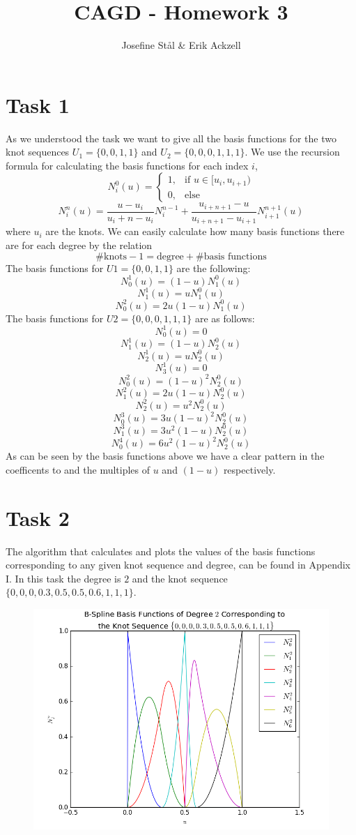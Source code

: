 \documentclass[]{article}
\title{CAGD - Homework 3}
\author{Josefine St{\aa}l \& Erik Ackzell}
\begin{document}
\maketitle

\section*{Task 1}
As we understood the task we want to give all the basis functions for the two knot sequences $U_1=\{0,0,1,1\}$ and $U_2=\{0,0,0,1,1,1\}$. We use the recursion formula for calculating the basis functions for each index $i$,
$$N_i^0(u)=\left\{ \begin{array}{ll}
1, & \text{if } u\in [u_i,u_{i+1}) \\
0, & \text{else} \end{array}\right.$$
$$N_i^n(u)=\frac{u-u_i}{u_i+n-u_i}N_i^{n-1}+\frac{u_{i+n+1}-u}{u_{i+n+1}-u_{i+1}}N_{i+1}^{n+1}(u)$$
where $u_i$ are the knots. We can easily calculate how many basis functions there are for each degree by the relation $$\#\text{knots}-1=\text{degree}+\#\text{basis functions}$$ 
The basis functions for $U1=\{0,0,1,1\}$ are the following:
$$N_0^1(u)=(1-u)N_1^0(u)$$
$$N_1^1(u)=uN_1^0(u)$$
$$N_0^2(u)=2u(1-u)N_1^0(u)$$
The basis functions for $U2=\{0,0,0,1,1,1\}$ are as follows:
$$N_0^1(u)=0$$
$$N_1^1(u)=(1-u)N_2^0(u)$$
$$N_2^1(u)=uN_2^0(u)$$
$$N_3^1(u)=0$$
$$N_0^2(u)=(1-u)^2N_2^0(u)$$
$$N_1^2(u)=2u(1-u)N_2^0(u)$$
$$N_2^2(u)=u^2N_2^0(u)$$
$$N_0^3(u)=3u(1-u)^2N_2^0(u)$$
$$N_1^3(u)=3u^2(1-u)N_2^0(u)$$
$$N_0^4(u)=6u^2(1-u)^2N_2^0(u)$$
As can be seen by the basis functions above we have a clear pattern in the coefficents to and the multiples of $u$ and $(1-u)$ respectively.

\section*{Task 2}
The algorithm that calculates and plots the values of the basis functions corresponding to any given knot sequence and degree, can be found in Appendix I. In this task the degree is $2$ and the knot sequence $\{0,0,0,0.3,0.5,0.5,0.6,1,1,1\}$.
\begin{figure}[h!]
\includegraphics[scale=0.6]{task2}
\end{figure}
\end{document}
